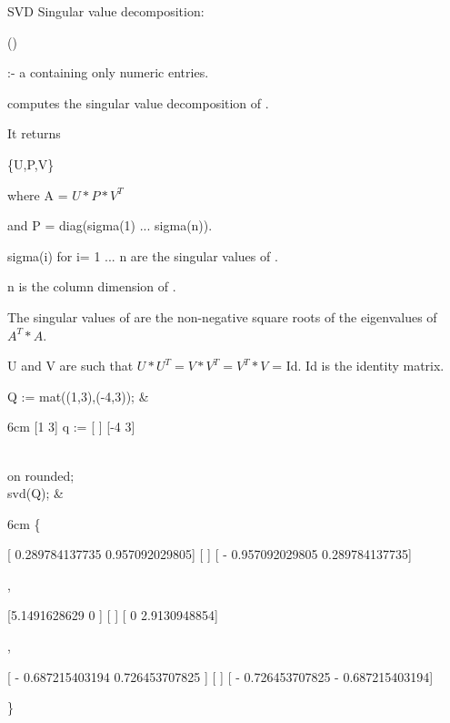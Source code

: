 \begin{Operator}[svd]{SVD}
Singular value decomposition:

\begin{Syntax}
()
\end{Syntax}

 :- a  containing only numeric entries.


 computes the singular value decomposition of . 

It returns 

\{U,P,V\} 

where A = $U*P*V^T$

and P = diag(sigma(1) ... sigma(n)). 

sigma(i) for i= 1 ... n are the singular values of 
.

n is the column dimension of .

The singular values of  are the non-negative square roots 
of the eigenvalues of $A^T*A$.

U and V are such that $U*U^T = V*V^T = V^T*V$ = Id.
Id is the identity matrix.


\begin{Examples}

Q := mat((1,3),(-4,3)); &
\begin{multilineoutput}{6cm}
     [1   3]
q := [     ]
     [-4  3]
\end{multilineoutput}\\

on rounded; \\
svd(Q); &
\begin{multilineoutput}{6cm}
\{

 [ 0.289784137735    0.957092029805]
 [                                 ]
 [ - 0.957092029805  0.289784137735]

 ,


 [5.1491628629       0      ]
 [                          ]
 [     0        2.9130948854]

 ,


 [ - 0.687215403194   0.726453707825  ]
 [                                    ]
 [ - 0.726453707825   - 0.687215403194]

\}
\end{multilineoutput}\\

\end{Examples}

\end{Operator}


